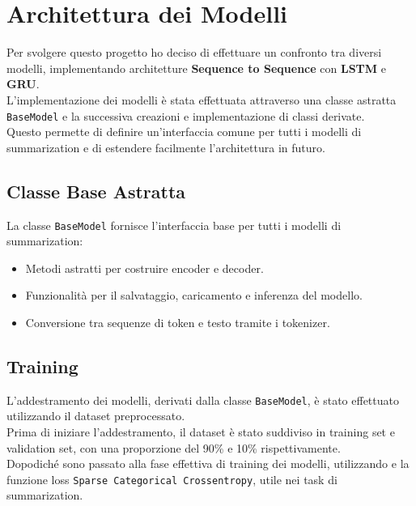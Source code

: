 

\section{Architettura dei Modelli}
Per svolgere questo progetto ho deciso di effettuare un confronto tra diversi modelli, implementando architetture \textbf{Sequence to Sequence} con \textbf{LSTM} e \textbf{GRU}.\\
L'implementazione dei modelli è stata effettuata attraverso una classe astratta \texttt{BaseModel} e la successiva creazioni e implementazione di classi derivate.\\
Questo permette di definire un'interfaccia comune per tutti i modelli di summarization e di estendere facilmente l'architettura in futuro.\\

\subsection{Classe Base Astratta}
La classe \texttt{BaseModel} fornisce l'interfaccia base per tutti i modelli di summarization:
\begin{itemize}
    \item Metodi astratti per costruire encoder e decoder.
    \item Funzionalità per il salvataggio, caricamento e inferenza del modello.
    \item Conversione tra sequenze di token e testo tramite i tokenizer.
\end{itemize}

\subsection{Training}
L'addestramento dei modelli, derivati dalla classe \texttt{BaseModel}, è stato effettuato utilizzando il dataset preprocessato.\\
Prima di iniziare l'addestramento, il dataset è stato suddiviso in training set e validation set, con una proporzione del 90\% e 10\% rispettivamente.\\
Dopodiché sono passato alla fase effettiva di training dei modelli, utilizzando e la funzione loss \texttt{Sparse Categorical Crossentropy}, utile nei task di summarization.\\

